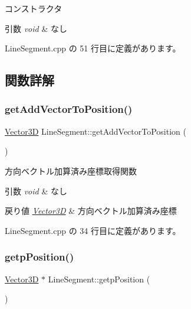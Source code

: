 コンストラクタ 


\begin{DoxyParams}{引数}
{\em void} & なし \\
\hline
\end{DoxyParams}


 Line\+Segment.\+cpp の 51 行目に定義があります。



\subsection{関数詳解}
\mbox{\label{class_line_segment_af4c9249a6a1c6c75b12962ef29e6dd30}} 
\subsubsection{\texorpdfstring{get\+Add\+Vector\+To\+Position()}{getAddVectorToPosition()}}
{\footnotesize\ttfamily \mbox{\hyperlink{class_vector3_d}{Vector3D}} Line\+Segment\+::get\+Add\+Vector\+To\+Position (\begin{DoxyParamCaption}{ }\end{DoxyParamCaption})}



方向ベクトル加算済み座標取得関数 


\begin{DoxyParams}{引数}
{\em void} & なし \\
\hline
\end{DoxyParams}

\begin{DoxyRetVals}{戻り値}
{\em \mbox{\hyperlink{class_vector3_d}{Vector3D}}} & 方向ベクトル加算済み座標 \\
\hline
\end{DoxyRetVals}


 Line\+Segment.\+cpp の 34 行目に定義があります。

\mbox{\label{class_line_segment_ab32e8ccf6167f28f75382c94c6c7873d}} 
\subsubsection{\texorpdfstring{getp\+Position()}{getpPosition()}}
{\footnotesize\ttfamily \mbox{\hyperlink{class_vector3_d}{Vector3D}} $\ast$ Line\+Segment\+::getp\+Position (\begin{DoxyParamCaption}{ }\end{DoxyParamCaption})}



